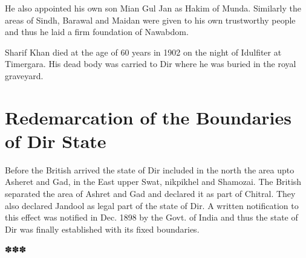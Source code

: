 \documentclass[twoside,openright]{book}
\begin{document}
He also appointed his own son Mian Gul Jan as Hakim of Munda. Similarly the
areas of Sindh, Barawal and Maidan were given to his own trustworthy people and
thus he laid a firm foundation of Nawabdom.

Sharif Khan died at the age of 60 years in 1902 on the night of Idulfiter at
Timergara. His dead body was carried to Dir where he was buried in the royal
graveyard.

\section{Redemarcation of the Boundaries of Dir State}

Before the British arrived the state of Dir included in the north the area upto
Asheret and Gad, in the East upper Swat, nikpikhel and Shamozai. The British
separated the area of Ashret and Gad and declared it as part of Chitral. They
also declared Jandool as legal part of the state of Dir. A written notification
to this effect was notified in Dec. 1898 by the Govt. of India and thus the
state of Dir was finally established with its fixed boundaries.


\centerline{✽\quad ✽\quad ✽}
\end{document}
